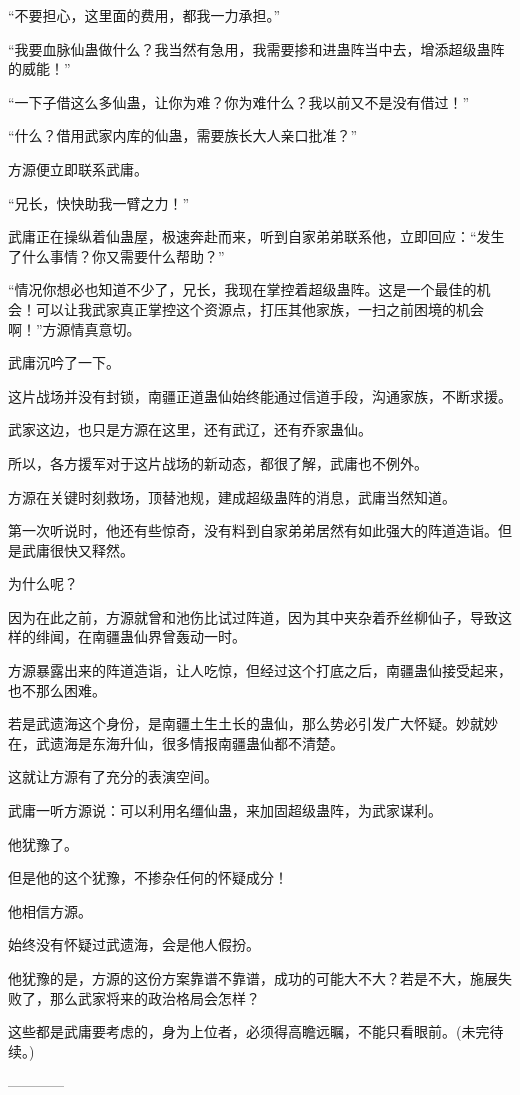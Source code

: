 \begin{this_body}
“不要担心，这里面的费用，都我一力承担。”

“我要血脉仙蛊做什么？我当然有急用，我需要掺和进蛊阵当中去，增添超级蛊阵的威能！”

“一下子借这么多仙蛊，让你为难？你为难什么？我以前又不是没有借过！”

“什么？借用武家内库的仙蛊，需要族长大人亲口批准？”

方源便立即联系武庸。

“兄长，快快助我一臂之力！”

武庸正在操纵着仙蛊屋，极速奔赴而来，听到自家弟弟联系他，立即回应：“发生了什么事情？你又需要什么帮助？”

“情况你想必也知道不少了，兄长，我现在掌控着超级蛊阵。这是一个最佳的机会！可以让我武家真正掌控这个资源点，打压其他家族，一扫之前困境的机会啊！”方源情真意切。

武庸沉吟了一下。

这片战场并没有封锁，南疆正道蛊仙始终能通过信道手段，沟通家族，不断求援。

武家这边，也只是方源在这里，还有武辽，还有乔家蛊仙。

所以，各方援军对于这片战场的新动态，都很了解，武庸也不例外。

方源在关键时刻救场，顶替池规，建成超级蛊阵的消息，武庸当然知道。

第一次听说时，他还有些惊奇，没有料到自家弟弟居然有如此强大的阵道造诣。但是武庸很快又释然。

为什么呢？

因为在此之前，方源就曾和池伤比试过阵道，因为其中夹杂着乔丝柳仙子，导致这样的绯闻，在南疆蛊仙界曾轰动一时。

方源暴露出来的阵道造诣，让人吃惊，但经过这个打底之后，南疆蛊仙接受起来，也不那么困难。

若是武遗海这个身份，是南疆土生土长的蛊仙，那么势必引发广大怀疑。妙就妙在，武遗海是东海升仙，很多情报南疆蛊仙都不清楚。

这就让方源有了充分的表演空间。

武庸一听方源说：可以利用名缰仙蛊，来加固超级蛊阵，为武家谋利。

他犹豫了。

但是他的这个犹豫，不掺杂任何的怀疑成分！

他相信方源。

始终没有怀疑过武遗海，会是他人假扮。

他犹豫的是，方源的这份方案靠谱不靠谱，成功的可能大不大？若是不大，施展失败了，那么武家将来的政治格局会怎样？

这些都是武庸要考虑的，身为上位者，必须得高瞻远瞩，不能只看眼前。(未完待续。)

------------

\end{this_body}

